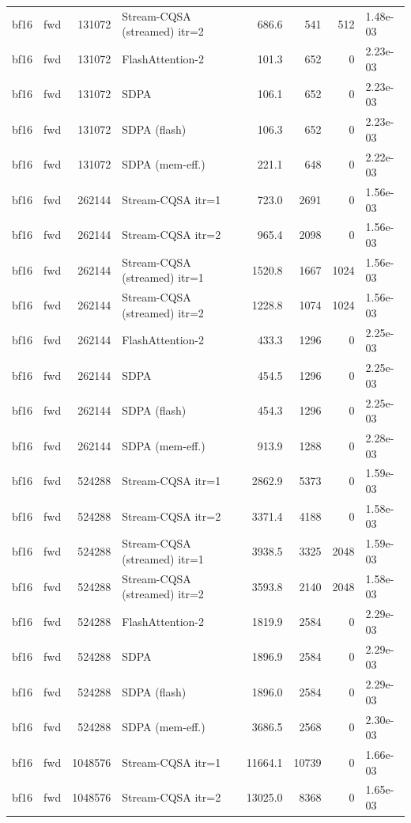 \begin{tabular}{llrlrrrl}
bf16 & fwd & 131072 & Stream-CQSA (streamed) itr=2 & 686.6 & 541 & 512 & 1.48e-03 \\
bf16 & fwd & 131072 & FlashAttention-2 & 101.3 & 652 & 0 & 2.23e-03 \\
bf16 & fwd & 131072 & SDPA & 106.1 & 652 & 0 & 2.23e-03 \\
bf16 & fwd & 131072 & SDPA (flash) & 106.3 & 652 & 0 & 2.23e-03 \\
bf16 & fwd & 131072 & SDPA (mem-eff.) & 221.1 & 648 & 0 & 2.22e-03 \\
bf16 & fwd & 262144 & Stream-CQSA itr=1 & 723.0 & 2691 & 0 & 1.56e-03 \\
bf16 & fwd & 262144 & Stream-CQSA itr=2 & 965.4 & 2098 & 0 & 1.56e-03 \\
bf16 & fwd & 262144 & Stream-CQSA (streamed) itr=1 & 1520.8 & 1667 & 1024 & 1.56e-03 \\
bf16 & fwd & 262144 & Stream-CQSA (streamed) itr=2 & 1228.8 & 1074 & 1024 & 1.56e-03 \\
bf16 & fwd & 262144 & FlashAttention-2 & 433.3 & 1296 & 0 & 2.25e-03 \\
bf16 & fwd & 262144 & SDPA & 454.5 & 1296 & 0 & 2.25e-03 \\
bf16 & fwd & 262144 & SDPA (flash) & 454.3 & 1296 & 0 & 2.25e-03 \\
bf16 & fwd & 262144 & SDPA (mem-eff.) & 913.9 & 1288 & 0 & 2.28e-03 \\
bf16 & fwd & 524288 & Stream-CQSA itr=1 & 2862.9 & 5373 & 0 & 1.59e-03 \\
bf16 & fwd & 524288 & Stream-CQSA itr=2 & 3371.4 & 4188 & 0 & 1.58e-03 \\
bf16 & fwd & 524288 & Stream-CQSA (streamed) itr=1 & 3938.5 & 3325 & 2048 & 1.59e-03 \\
bf16 & fwd & 524288 & Stream-CQSA (streamed) itr=2 & 3593.8 & 2140 & 2048 & 1.58e-03 \\
bf16 & fwd & 524288 & FlashAttention-2 & 1819.9 & 2584 & 0 & 2.29e-03 \\
bf16 & fwd & 524288 & SDPA & 1896.9 & 2584 & 0 & 2.29e-03 \\
bf16 & fwd & 524288 & SDPA (flash) & 1896.0 & 2584 & 0 & 2.29e-03 \\
bf16 & fwd & 524288 & SDPA (mem-eff.) & 3686.5 & 2568 & 0 & 2.30e-03 \\
bf16 & fwd & 1048576 & Stream-CQSA itr=1 & 11664.1 & 10739 & 0 & 1.66e-03 \\
bf16 & fwd & 1048576 & Stream-CQSA itr=2 & 13025.0 & 8368 & 0 & 1.65e-03 \\

\end{tabular}
